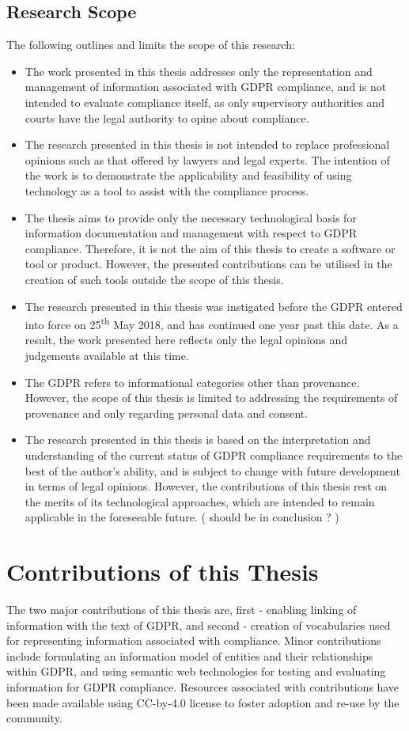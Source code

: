 \subsection{Research Scope}\label{sec:intro-scope}
The following outlines and limits the scope of this research:
\begin{itemize}
    \item The work presented in this thesis addresses only the representation and management of information associated with GDPR compliance, and is not intended to evaluate compliance itself, as only supervisory authorities and courts have the legal authority to opine about compliance.
    \item The research presented in this thesis is not intended to replace professional opinions such as that offered by lawyers and legal experts. The intention of the work is to demonstrate the applicability and feasibility of using technology as a tool to assist with the compliance process.
    \item The thesis aims to provide only the necessary technological basis for information documentation and management with respect to GDPR compliance. Therefore, it is not the aim of this thesis to create a software or tool or product. However, the presented contributions can be utilised in the creation of such tools outside the scope of this thesis.
    \item The research presented in this thesis was instigated before the GDPR entered into force on 25\textsuperscript{th} May 2018, and has continued one year past this date. As a result, the work presented here reflects only the legal opinions and judgements available at this time.
    \item The GDPR refers to informational categories other than provenance. However, the scope of this thesis is limited to addressing the requirements of provenance and only regarding personal data and consent.
    \item The research presented in this thesis is based on the interpretation and understanding of the current status of GDPR compliance requirements to the best of the author's ability, and is subject to change with future development in terms of legal opinions. However, the contributions of this thesis rest on the merits of its technological approaches, which are intended to remain applicable in the foreseeable future. ( should be in conclusion ? )
\end{itemize}

\section{Contributions of this Thesis}\label{sec:intro-contributions}
The two major contributions of this thesis are, first - enabling linking of information with the text of GDPR, and second - creation of vocabularies used for representing information associated with compliance. Minor contributions include formulating an information model of entities and their relationships within GDPR, and using semantic web technologies for testing and evaluating information for GDPR compliance. Resources associated with contributions have been made available using CC-by-4.0 license to foster adoption and re-use by the community.

